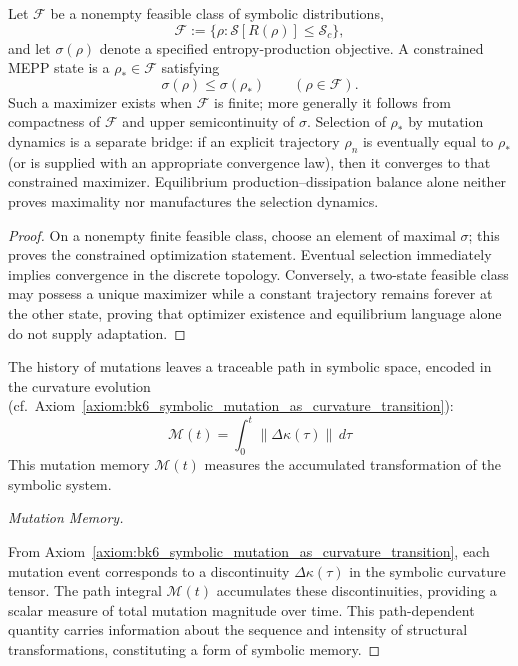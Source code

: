 \begin{proposition}
\label{proposition:bk6_thermodynamic_interpretation}
Let $\mathcal F$ be a nonempty feasible class of symbolic distributions,
\[
 \mathcal F:=\{\rho:\mathcal S[R(\rho)]\leq\mathcal S_c\},
\]
and let $\sigma(\rho)$ denote a specified entropy-production objective. A
constrained MEPP state is a $\rho_*\in\mathcal F$ satisfying
\[
 \sigma(\rho)\leq\sigma(\rho_*)\qquad(\rho\in\mathcal F).
\]
Such a maximizer exists when $\mathcal F$ is finite; more generally it follows
from compactness of $\mathcal F$ and upper semicontinuity of $\sigma$.
Selection of $\rho_*$ by mutation dynamics is a separate bridge: if an explicit
trajectory $\rho_n$ is eventually equal to $\rho_*$ (or is supplied with an
appropriate convergence law), then it converges to that constrained maximizer.
Equilibrium production--dissipation balance alone neither proves maximality nor
manufactures the selection dynamics.
\begin{proof}
\label{proof:bk6_thermodynamic_interpretation}
On a nonempty finite feasible class, choose an element of maximal $\sigma$;
this proves the constrained optimization statement. Eventual selection
immediately implies convergence in the discrete topology. Conversely, a
two-state feasible class may possess a unique maximizer while a constant
trajectory remains forever at the other state, proving that optimizer
existence and equilibrium language alone do not supply adaptation.
\end{proof}
\end{proposition}
\begin{corollary}
\label{corollary:bk6_mutation_memory}
The history of mutations leaves a traceable path in symbolic space, encoded in the curvature evolution (cf.~Axiom~\ref{axiom:bk6_symbolic_mutation_as_curvature_transition}):
\begin{equation}
\mathcal{M}(t) = \int_0^t \|\Delta\kappa(\tau)\| \, d\tau
\end{equation}
This mutation memory $\mathcal{M}(t)$ measures the accumulated transformation of the symbolic system.
\begin{proof}[Mutation Memory]
\label{proof:bk6_mutation_memory}
\leavevmode

From Axiom~\ref{axiom:bk6_symbolic_mutation_as_curvature_transition}, each mutation event corresponds to a discontinuity $\Delta\kappa(\tau)$ in the symbolic curvature tensor. The path integral $\mathcal{M}(t)$ accumulates these discontinuities, providing a scalar measure of total mutation magnitude over time. This path-dependent quantity carries information about the sequence and intensity of structural transformations, constituting a form of symbolic memory.
\end{proof}
\end{corollary}
